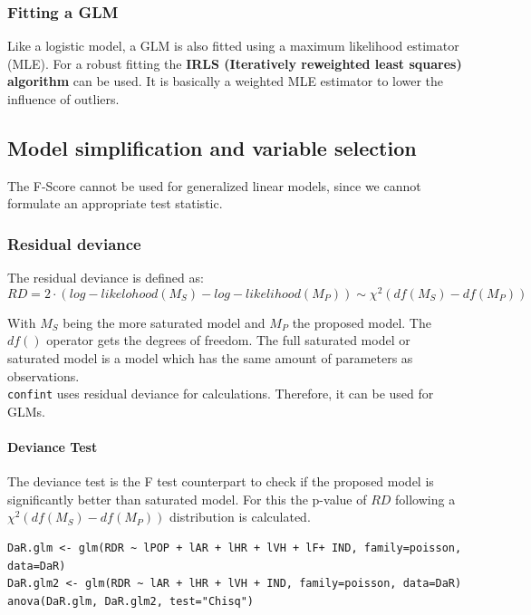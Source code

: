 \subsubsection{Fitting a GLM}

Like a logistic model, a GLM is also fitted using a maximum likelihood estimator (MLE). For a robust fitting the \textbf{IRLS (Iteratively reweighted least squares) algorithm} can be used. It is basically a weighted MLE estimator to lower the influence of outliers.

\subsection{Model simplification and variable selection}

The F-Score cannot be used for generalized linear models, since we cannot formulate an appropriate test statistic.

\subsubsection{Residual deviance}

The residual deviance is defined as:
\begin{equation*}
RD = 2\cdot (log-likelohood(M_S) - log-likelihood(M_P)) \sim \chi^2(df(M_S) - df(M_P))
\end{equation*}

With $M_S$ being the more saturated model and $M_P$ the proposed model. The $df()$ operator gets the degrees of freedom. The full saturated model or saturated model is a model which has the same amount of parameters as observations.\\
\lstinline{confint} uses residual deviance for calculations. Therefore, it can be used for GLMs.

\paragraph{Deviance Test}
The deviance test is the F test counterpart to check if the proposed model is significantly better than saturated model. For this the p-value of $RD$ following a  $\chi^2(df(M_S) - df(M_P))$ distribution is calculated.

\begin{lstlisting}
DaR.glm <- glm(RDR ~ lPOP + lAR + lHR + lVH + lF+ IND, family=poisson,
data=DaR)
DaR.glm2 <- glm(RDR ~ lAR + lHR + lVH + IND, family=poisson, data=DaR)
anova(DaR.glm, DaR.glm2, test="Chisq")
\end{lstlisting}

